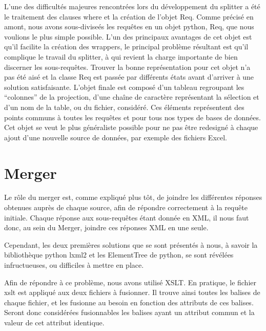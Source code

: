 L’une des difficultés majeures rencontrées lors du développement du splitter a été le traitement des clauses where et la création de l’objet Req. Comme précisé en amont, nous avons sous-diviseés les requêtes en un objet python, Req, que nous voulions le plus simple possible. L’un des principaux avantages de cet objet est qu’il facilite la création des wrappers, le principal problème résultant est qu’il complique le travail du splitter, à qui revient la charge importante de bien discerner les sous-requêtes. Trouver la bonne représentation pour cet objet n’a pas été aisé et la classe Req est passée par différents états avant d’arriver à une solution satisfaisante. L’objet finale est composé d’un tableau regroupant les “colonnes” de la projection, d’une chaîne de caractère représentant la sélection et d’un nom de la table, ou du fichier, considéré. Ces éléments représentent des points communs à toutes les requêtes et pour tous nos types de bases de données. Cet objet se veut le plus généraliste possible pour ne pas être redesigné à chaque ajout d’une nouvelle source de données, par exemple des fichiers Excel.

\section{Merger}

Le rôle du merger est, comme expliqué plus tôt, de joindre les différentes réponses obtenues auprès de chaque source, afin de répondre correctement à la requête initiale. Chaque réponse aux sous-requêtes étant donnée en XML, il nous faut donc, au sein du Merger, joindre ces réponses XML en une seule.

Cependant, les deux premières solutions que se sont présentés à nous, à savoir la bibliothèque python lxml2 et les ElementTree de python, se sont révélées infructueuses, ou difficiles à mettre en place.

Afin de répondre à ce problème, nous avons utilisé XSLT. En pratique, le fichier xslt est appliqué aux deux fichiers à fusionner. Il trouve ainsi toutes les balises de chaque fichier, et les fusionne au besoin en fonction des attributs de ces balises. Seront donc considérées fusionnables les balises ayant un attribut commun et la valeur de cet attribut identique.

